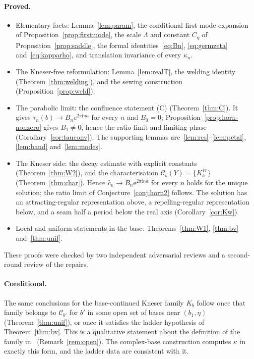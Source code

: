 \documentclass[11pt,a4paper]{article}
\theoremstyle{definition}
\newcommand{\Kk}{K}
\newcommand{\eee}{\mathrm{e}}
\newcommand{\ii}{\mathrm{i}}
\begin{document}
\paragraph{Proved.}
\begin{itemize}
\item Elementary facts: Lemma~\ref{lem:param}, the conditional first-mode
  expansion of Proposition~\ref{prop:firstmode}, the scale $\Lambda$ and constant
  $C_\eta$ of Proposition~\ref{prop:saddle}, the formal
  identities~\eqref{eq:Bn}, \eqref{eq:germzeta} and~\eqref{eq:kapparho}, and
  translation invariance of every $\kappa_n$.
\item The Kneser-free reformulation: Lemma~\ref{lem:realT}, the welding identity
  (Theorem~\ref{thm:welding}), and the sewing construction
  (Proposition~\ref{prop:weld}).
\item The parabolic limit: the confluence statement (C) (Theorem~\ref{thm:C}).
  It gives $\tau_n(b)\to B_n\eee^{2\pi\ii na}$ for every $n$ and $B_0=0$;
  Proposition~\ref{prop:horn-nonzero} gives $B_1\ne0$, hence the ratio limit
  and limiting phase (Corollary~\ref{cor:tauconv}).
  The supporting lemmas are~\ref{lem:res}--\ref{lem:petal},
  \ref{lem:band} and~\ref{lem:modes}.
\item The Kneser side: the decay estimate with explicit constants
  (Theorem~\ref{thm:W2}), and the characterisation
  $\mathcal C_b(Y)=\{\Kk^W_b\}$ (Theorem~\ref{thm:char}).  Hence
  $\hat c_n\to B_n\eee^{2\pi\ii na}$ for every $n$ holds for the unique solution;
  the ratio limit of Conjecture~\ref{conj:horn2} follows.  The
  solution has an attracting-regular representation above, a repelling-regular
  representation below, and a seam half a period below the real axis
  (Corollary~\ref{cor:Kw}).
\item Local and uniform statements in the base: Theorems~\ref{thm:W1},
  \ref{thm:bv} and~\ref{thm:unif}.
\end{itemize}
These proofs were checked by two independent adversarial reviews and a
second-round review of the repairs.

\paragraph{Conditional.}
The same conclusions for the base-continued Kneser family $\Kk_b$ follow once
that family belongs to $\mathcal C_{b'}$ for $b'$ in some open set of bases near
$(b_1,\eta)$ (Theorem~\ref{thm:unif}), or once it satisfies the ladder
hypothesis of Theorem~\ref{thm:bv}.  This is a qualitative statement about the
definition of the family in~\cite{Paulsen2019} (Remark~\ref{rem:open}).  The
complex-base construction computes $\kappa$ in exactly this form, and the
ladder data are consistent with it.
\end{document}
